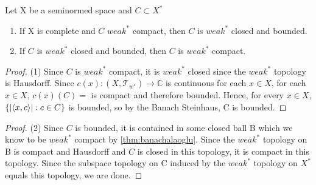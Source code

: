 \begin{cor}
    \label{thm:banachalaoglumorales}
    Let X be a seminormed space and $C \subset X^*$ 
    \begin{enumerate}
        \item If X is complete and $C$ $weak^*$ compact, then $C$ is $weak^*$ closed and bounded. 
        \item If $C$ is $weak^*$ closed and bounded, then $C$ is $weak^*$ compact. 
    \end{enumerate}
    \begin{proof}(1)
        Since $C$ is $weak^*$ compact, it is $weak^*$ closed since the $weak^*$ topology is Hausdorff. Since $c(x):(X,\mathcal{T}_{w^*}) \to \mathbb{C}$ is continuous for each $x \in X$, for each $x \in X$, $c(x)(C)=$ is compact and therefore bounded. Hence, for every $x \in X$, $\{\left| \left\langle x,c \right\rangle \right| : c \in C\}$ is bounded, so by the Banach Steinhaus, C is bounded. 
    \end{proof}
    \begin{proof}(2)
        Since $C$ is bounded, it is contained in some closed ball B which we know to be $weak^*$ compact by \ref{thm:banachalaoglu}. Since the $weak^*$ topology on B is compact and  Hausdorff and $C$ is closed in this topology, it is compact in this topology. Since the subspace topology on C induced by the $weak^*$ topology on $X^*$ equals this topology, we are done.  
    \end{proof} 
\end{cor} 
